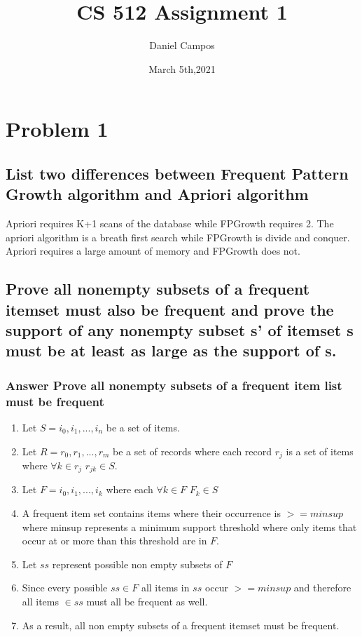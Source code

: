 \documentclass[11pt]{article}
\title{CS 512 Assignment 1}
\author{Daniel Campos}
\date{March 5th,2021}
\begin{document}
\maketitle
\section{Problem 1}
\subsection{List two differences between Frequent Pattern Growth algorithm and Apriori
algorithm
}
Apriori requires K+1 scans of the database while FPGrowth requires 2. The apriori algorithm is a breath first search while FPGrowth is divide and conquer.  Apriori requires a large amount of memory and FPGrowth does not. 
\subsection{Prove all nonempty subsets of a frequent itemset must also be frequent and prove the support of any nonempty subset s' of itemset s must be at least as large as the support of s.}
\subsubsection{Answer Prove all nonempty subsets of a frequent item list must be frequent}
\begin{enumerate}
    \item Let $S = {i_0, i_1,..., i_n}$ be a set of items.
    \item Let $R = {r_0, r_1, ...,r_m}$ be a set of records where each record $r_j$ is a set of items where $\forall k \in r_j$ $r_{jk} \in S$.
    \item Let $F = {i_0, i_1, ...,i_k}$ where each $\forall k \in F$ $F_k \in S$
    \item A frequent item set contains items where their occurrence is $>= minsup$ where minsup represents a minimum support threshold where only items that occur at or more than this threshold are in $F$. 
    \item Let $ss$ represent possible non empty subsets of $F$
    \item Since every possible $ss \in F$ all items in $ss$ occur $>= minsup$ and therefore all items $\in ss$ must all be frequent as well. 
    \item As a result, all non empty subsets of a frequent itemset must be frequent.
\end{enumerate}
\end{document}
